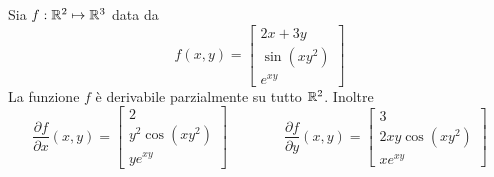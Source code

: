 \begin{example}
	Sia $f: \mathbb{R}^2 \mapsto \mathbb{R}^3$ data da
	\begin{equation*}
		f(x,y) =
		\begin{bmatrix}
			2x + 3y\\
			\sin (xy^2)\\
			e^{xy}
		\end{bmatrix}
	\end{equation*}
	La funzione $f$ è derivabile parzialmente su tutto $\mathbb{R}^2$. Inoltre
	\[
		\frac{\partial f}{\partial x}(x,y) =
		\begin{bmatrix}
			2\\
			y^2 \cos (xy^2)\\
			y e^{xy}
		\end{bmatrix}
		\qquad\qquad
		\frac{\partial f}{\partial y}(x,y) =
		\begin{bmatrix}
			3\\
			2xy \cos (xy^2)\\
			x e^{xy}
		\end{bmatrix}
	\]
\end{example}

